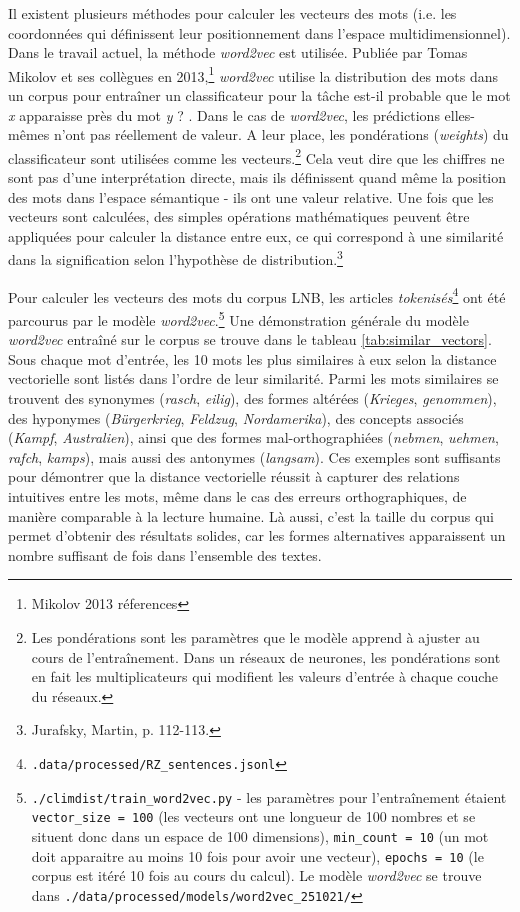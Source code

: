 \documentclass[a4paper,twoside,12pt]{article}
\begin{document}
Il existent plusieurs méthodes pour calculer les vecteurs des mots (i.e. les coordonnées qui définissent leur positionnement dans l'espace multidimensionnel). Dans le travail actuel, la méthode \textit{word2vec} est utilisée. Publiée par Tomas Mikolov et ses collègues en 2013,\footnote{Mikolov 2013 réferences} \textit{word2vec} utilise la distribution des mots dans un corpus pour entraîner un classificateur pour la tâche \og est-il probable que le mot \textit{x} apparaisse près du mot \textit{y} ? \fg{}. Dans le cas de \textit{word2vec}, les prédictions elles-mêmes n'ont pas réellement de valeur. A leur place, les pondérations (\textit{weights}) du classificateur sont utilisées comme les vecteurs.\footnote{Les pondérations sont les paramètres que le modèle apprend à ajuster au cours de l'entraînement. Dans un réseaux de neurones, les pondérations sont en fait les multiplicateurs qui modifient les valeurs d'entrée à chaque couche du réseaux.} Cela veut dire que les chiffres ne sont pas d'une interprétation directe, mais ils définissent quand même la position des mots dans l'espace sémantique - ils ont une valeur relative. Une fois que les vecteurs sont calculées, des simples opérations mathématiques peuvent être appliquées pour calculer la distance entre eux, ce qui correspond à une similarité dans la signification selon l'hypothèse de distribution.\footnote{Jurafsky, Martin, p. 112-113.}

Pour calculer les vecteurs des mots du corpus LNB, les articles \textit{tokenisés}\footnote{\texttt{.data/processed/RZ\_sentences.jsonl}} ont été parcourus par le modèle \textit{word2vec}.\footnote{\texttt{./climdist/train\_word2vec.py} - les paramètres pour l'entraînement étaient \texttt{vector\_size = 100} (les vecteurs ont une longueur de 100 nombres et se situent donc dans un espace de 100 dimensions), \texttt{min\_count = 10} (un mot doit apparaitre au moins 10 fois pour avoir une vecteur), \texttt{epochs = 10} (le corpus est itéré 10 fois au cours du calcul). Le modèle \textit{word2vec} se trouve dans \texttt{./data/processed/models/word2vec\_251021/}} Une démonstration générale du modèle \textit{word2vec} entraîné sur le corpus se trouve dans le tableau \ref{tab:similar_vectors}. Sous chaque mot d'entrée, les 10 mots les plus similaires à eux selon la distance vectorielle sont listés dans l'ordre de leur similarité. Parmi les mots similaires se trouvent des synonymes (\textit{rasch}, \textit{eilig}), des formes altérées (\textit{Krieges}, \textit{genommen}), des hyponymes (\textit{Bürgerkrieg}, \textit{Feldzug}, \textit{Nordamerika}), des concepts associés (\textit{Kampf}, \textit{Australien}), ainsi que des formes mal-orthographiées (\textit{nebmen}, \textit{uehmen}, \textit{rafch}, \textit{kamps}), mais aussi des antonymes (\textit{langsam}). Ces exemples sont suffisants pour démontrer que la distance vectorielle réussit à capturer des relations intuitives entre les mots, même dans le cas des erreurs orthographiques, de manière comparable à la lecture humaine. Là aussi, c'est la taille du corpus qui permet d'obtenir des résultats solides, car les formes alternatives apparaissent un nombre suffisant de fois dans l'ensemble des textes.
\end{document}
